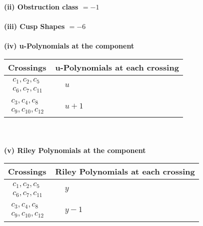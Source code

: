 \documentclass[1p]{elsarticle_modified}
\theoremstyle{definition}
\begin{document}
\flushleft \textbf{(ii) Obstruction class $= -1$}\\~\\
\flushleft \textbf{(iii) Cusp Shapes $= -6$}\\~\\
\newpage\renewcommand{\arraystretch}{1}
\flushleft \textbf{(iv) u-Polynomials at the component}\newline \\
\begin{tabular}{m{50pt}|m{274pt}}
Crossings & \hspace{64pt}u-Polynomials at each crossing \\
\hline $$\begin{aligned}c_{1},c_{2},c_{5}\\c_{6},c_{7},c_{11}\end{aligned}$$&$\begin{aligned}
&u
\end{aligned}$\\
\hline $$\begin{aligned}c_{3},c_{4},c_{8}\\c_{9},c_{10},c_{12}\end{aligned}$$&$\begin{aligned}
&u+1
\end{aligned}$\\
\hline
\end{tabular}\\~\\
\newpage\renewcommand{\arraystretch}{1}
\flushleft \textbf{(v) Riley Polynomials at the component}\newline \\
\begin{tabular}{m{50pt}|m{274pt}}
Crossings & \hspace{64pt}Riley Polynomials at each crossing \\
\hline $$\begin{aligned}c_{1},c_{2},c_{5}\\c_{6},c_{7},c_{11}\end{aligned}$$&$\begin{aligned}
&y
\end{aligned}$\\
\hline $$\begin{aligned}c_{3},c_{4},c_{8}\\c_{9},c_{10},c_{12}\end{aligned}$$&$\begin{aligned}
&y-1
\end{aligned}$\\
\hline
\end{tabular}\\~\\
\end{document}

